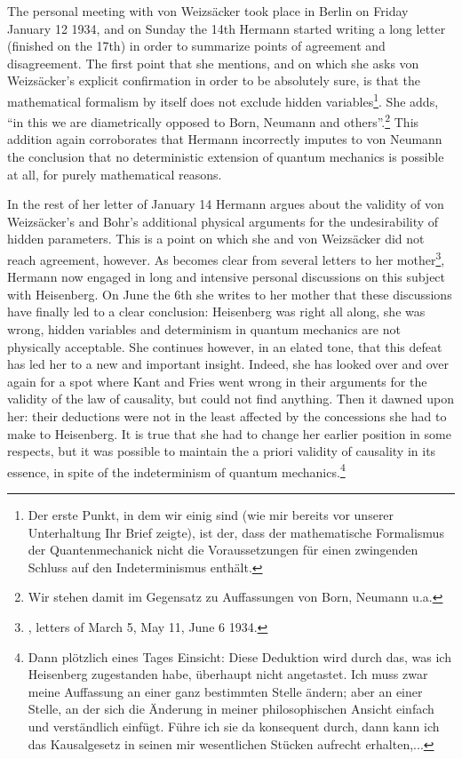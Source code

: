 \documentclass[12pt]{article}
\begin{document}
The personal meeting with von Weizs\"{a}cker took place in Berlin on Friday January 12 1934, and on Sunday the 14th Hermann started writing a long letter (finished on the 17th)  in order to summarize points of agreement and disagreement. The first point that she mentions, and on which she asks von Weizs\"{a}cker's explicit confirmation in order to be absolutely sure, is that the mathematical formalism by itself does not exclude hidden variables\footnote{Der erste Punkt, in dem wir einig sind (wie mir bereits vor unserer Unterhaltung Ihr Brief zeigte), ist der, dass der mathematische Formalismus der Quantenmechanick nicht die Voraussetzungen f\"{u}r einen zwingenden Schluss auf den Indeterminismus enth\"{a}lt.}.  She adds, ``in this we are diametrically opposed to Born, Neumann and others''.\footnote{Wir stehen damit im Gegensatz zu Auffassungen von Born, Neumann u.a.} This addition again corroborates that Hermann incorrectly imputes to von Neumann the conclusion that no deterministic extension of quantum mechanics is possible at all, for purely mathematical reasons.  

In the rest of her letter of  January 14  Hermann argues about the validity of von Weizs\"{a}cker's and Bohr's additional physical arguments for the undesirability of hidden parameters. This is a point on which she and von Weizs\"{a}cker did not reach agreement, however. As becomes clear from several letters to her mother\footnote{\cite{kay}, letters of March 5, May 11, June 6 1934.}, Hermann now engaged in long and intensive personal discussions on this subject with Heisenberg. On June the 6th she writes to her mother that these discussions have finally led to a clear conclusion: Heisenberg was right all along, she was wrong, hidden variables and determinism in quantum mechanics are not physically acceptable. She continues however, in an elated tone, that this defeat has led her to a new and important insight.  Indeed, she has looked over and over again for a spot where Kant and Fries went wrong in their arguments for the validity of the law of causality, but could not find anything. Then it dawned upon her: their deductions were not in the least affected by the concessions she had to make to Heisenberg. It is true that she had to change her earlier position in some respects,  but it was possible to maintain the a priori validity of causality in its essence, in spite of the indeterminism of quantum mechanics.\footnote{Dann pl\"{o}tzlich eines Tages Einsicht: Diese Deduktion wird durch das, was ich Heisenberg zugestanden habe, \"{u}berhaupt nicht angetastet. Ich muss zwar meine Auffassung an einer ganz bestimmten Stelle \"{a}ndern; aber an einer Stelle, an der sich die \"{A}nderung in meiner philosophischen Ansicht einfach und verst\"{a}ndlich einf\"{u}gt. F\"{u}hre ich sie da konsequent durch, dann kann ich das Kausalgesetz in seinen mir wesentlichen St\"{u}cken aufrecht erhalten,... }         
\end{document}

